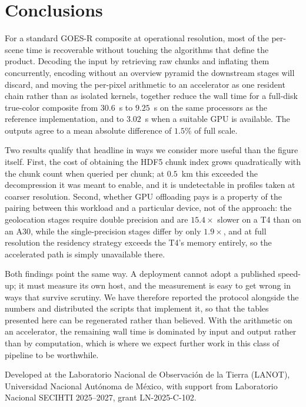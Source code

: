 \documentclass{ametsocV6.1}
\begin{document}
\section{Conclusions}
\label{sec:conclusions}

For a standard GOES-R composite at operational resolution, most of the
per-scene time is recoverable without touching the algorithms that define the
product. Decoding the input by retrieving raw chunks and inflating them
concurrently, encoding without an overview pyramid the downstream stages will
discard, and moving the per-pixel arithmetic to an accelerator as one resident
chain rather than as isolated kernels, together reduce the wall time for a
full-disk true-color composite from $30.6$~s to $9.25$~s on the same processors
as the reference implementation, and to $3.02$~s when a suitable GPU is
available. The outputs agree to a mean absolute difference of $1.5\%$ of full
scale.

Two results qualify that headline in ways we consider more useful than the
figure itself. First, the cost of obtaining the HDF5 chunk index grows
quadratically with the chunk count when queried per chunk; at $0.5$~km this
exceeded the decompression it was meant to enable, and it is undetectable in
profiles taken at coarser resolution. Second, whether GPU offloading pays is a
property of the pairing between this workload and a particular device, not of
the approach: the geolocation stages require double precision and are
$15.4\times$ slower on a T4 than on an A30, while the single-precision stages
differ by only $1.9\times$, and at full resolution the residency strategy
exceeds the T4's memory entirely, so the accelerated path is simply
unavailable there.

Both findings point the same way. A deployment cannot adopt a published
speed-up; it must measure its own host, and the measurement is easy to get
wrong in ways that survive scrutiny. We have therefore reported the protocol
alongside the numbers and distributed the scripts that implement it, so that
the tables presented here can be regenerated rather than believed. With the
arithmetic on an accelerator, the remaining wall time is dominated by input and
output rather than by computation, which is where we expect further work in
this class of pipeline to be worthwhile.

\acknowledgments
Developed at the Laboratorio Nacional de Observaci\'on de la Tierra (LANOT),
Universidad Nacional Aut\'onoma de M\'exico, with support from Laboratorio
Nacional SECIHTI 2025--2027, grant LN-2025-C-102.
\end{document}
